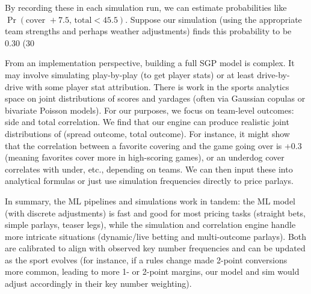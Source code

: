 \documentclass[11pt]{amsart}
\begin{document}
By recording these in each simulation run, we can estimate probabilities like $\Pr(\text{cover }+7.5,\, \text{total}<45.5)$. Suppose our simulation (using the appropriate team strengths and perhaps weather adjustments) finds this probability to be 0.30 (30%

From an implementation perspective, building a full SGP model is complex. It may involve simulating play-by-play (to get player stats) or at least drive-by-drive with some player stat attribution. There is work in the sports analytics space on joint distributions of scores and yardages (often via Gaussian copulas or bivariate Poisson models). For our purposes, we focus on team-level outcomes: side and total correlation. We find that our engine can produce realistic joint distributions of (spread outcome, total outcome). For instance, it might show that the correlation between a favorite covering and the game going over is +0.3 (meaning favorites cover more in high-scoring games), or an underdog cover correlates with under, etc., depending on teams. We can then input these into analytical formulas or just use simulation frequencies directly to price parlays.

In summary, the ML pipelines and simulations work in tandem: the ML model (with discrete adjustments) is fast and good for most pricing tasks (straight bets, simple parlays, teaser legs), while the simulation and correlation engine handle more intricate situations (dynamic/live betting and multi-outcome parlays). Both are calibrated to align with observed key number frequencies and can be updated as the sport evolves (for instance, if a rules change made 2-point conversions more common, leading to more 1- or 2-point margins, our model and sim would adjust accordingly in their key number weighting).
\end{document}
